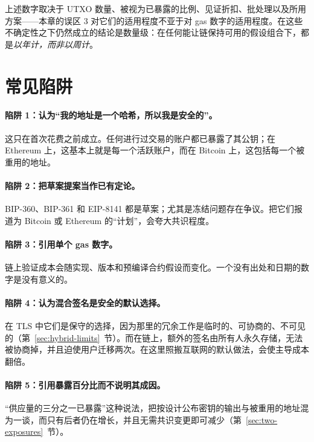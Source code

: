 \begin{remark}[请勿引用这个数字]
上述数字取决于 UTXO 数量、被视为已暴露的比例、见证折扣、批处理以及所用方案——本章的误区 3 对它们的适用程度不亚于对 gas 数字的适用程度。在这些不确定性之下仍然成立的结论是数量级：在任何能让链保持可用的假设组合下，都是\emph{以年计，而非以周计}。
\end{remark}

\section{常见陷阱}

\paragraph{陷阱 1：认为“我的地址是一个哈希，所以我是安全的”。}
这只在首次花费之前成立。任何进行过交易的账户都已暴露了其公钥；在 Ethereum 上，这基本上就是每一个活跃账户，而在 Bitcoin 上，这包括每一个被重用的地址。

\paragraph{陷阱 2：把草案提案当作已有定论。}
BIP-360、BIP-361 和 EIP-8141 都是草案；尤其是冻结问题存在争议。把它们报道为 Bitcoin 或 Ethereum 的“计划”，会夸大共识程度。

\paragraph{陷阱 3：引用单个 gas 数字。}
链上验证成本会随实现、版本和预编译合约假设而变化。一个没有出处和日期的数字是没有意义的。

\paragraph{陷阱 4：认为混合签名是安全的默认选择。}
在 TLS 中它们是保守的选择，因为那里的冗余工作是临时的、可协商的、不可见的（第~\ref{sec:hybrid-limits}~节）。而在链上，额外的签名由所有人永久存储，无法被协商掉，并且迫使用户迁移两次。在这里照搬互联网的默认做法，会使主导成本翻倍。

\paragraph{陷阱 5：引用暴露百分比而不说明其成因。}
“供应量的三分之一已暴露”这种说法，把按设计公布密钥的输出与被重用的地址混为一谈，而只有后者仍在增长，并且无需共识变更即可减少（第~\ref{sec:two-exposures}~节）。

